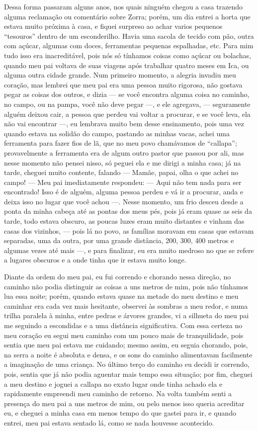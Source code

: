Dessa forma passaram alguns anos, nos quais ninguém chegou a casa trazendo alguma reclamação ou comentário sobre Zorra; porém, um dia entrei a horta que estava muito próxima à casa, e fiquei surpreso ao achar varios pequenos ``tesouros'' dentro de um esconderilho. Havia uma sacola de tecido com pão, outra com açúcar, algumas com doces, ferramentas pequenas espalhadas, etc. 
Para mim tudo isso era inacreditável, pois nós só tínhamos coisas como açúcar ou bolachas, quando meu pai voltava de suas viagens após trabalhar quatro meses em Ica, ou alguma outra cidade grande.
Num primeiro momento, a alegria invadiu meu coração, mas lembrei que meu pai era uma pessoa muito rigorosa, não gostava pegar as coisas dos outros, e dizia --- se você encontra alguma coisa no caminho, no campo, ou na pampa, você não deve pegar ---, e ele agregava, --- seguramente alguém deixou cair, a pessoa que perdeu vai voltar a procurar, e se você leva, ela não vai encontrar ---, 
eu lembrava muito bem desse ensinamento, pois uma vez quando estava na solidão do campo, pastando as minhas vacas, achei uma ferramenta para fazer fios de lã, que no meu povo chamávamos de ``callapa''; provavelmente a ferramenta era de algum outro pastor que passou por ali, mas nesse momento não pensei nisso, só peguei ela e me dirigi a minha casa; já na tarde, cheguei  muito contente, falando --- Mamãe, papai, olha o que achei no campo! --- 
Meu pai imediatamente respondeu: --- Aqui não tem nada para ser encontrado! Isso é de alguém, alguma pessoa perdeu e vá ir a procurar, anda e deixa isso no lugar que você achou ---. 
Nesse momento, um frio desceu desde a ponta da minha cabeça até as pontas dos meus pés, pois já eram quase as seis da tarde, todo estava obscuro, as poucas luzes eram muito distantes e vinham das casas dos vizinhos, --- pois lá no povo, as famílias moravam em casas que estavam separadas, uma da outra, por uma grande distância, 200, 300, 400 metros e algumas vezes até mais  ---, e para finalizar, eu era muito medroso no que se refere a lugares obscuros e a onde tinha que ir estava muito longe.

Diante da ordem do meu pai, eu fui correndo e chorando nessa direção, no caminho não podia distinguir as coisas a uns metros de mim, pois não tínhamos lua essa noite; porém, quando estava quase na metade do meu destino e meu caminhar era cada vez mais hesitante, observei às sombras a meu redor, e numa trilha paralela à minha, entre pedras e árvores grandes, vi a silhueta do meu pai me seguindo a escondidas e a uma distância significativa.
Com essa certeza no meu coração eu segui meu caminho com um pouco mais de tranquilidade, pois sentia que meu pai estava me cuidando; mesmo assim, eu seguia chorando, pois, na serra a noite é absoluta e densa, e os sons do caminho alimentavam facilmente a imaginação de uma criança.
No último terço do caminho eu decidi ir correndo, pois, sentia que já não podia aguentar mais tempo essa situação; por fim, cheguei a meu destino e joguei a callapa no exato lugar onde tinha achado ela e rapidamente empreendi meu caminho de retorno.
Na volta também senti a presença do meu pai a uns metros de mim, ou pelo menos isso queria acreditar eu, e cheguei a minha casa em menos tempo do que gastei para ir, e quando entrei, meu pai estava sentado lá, como se nada houvesse acontecido.


